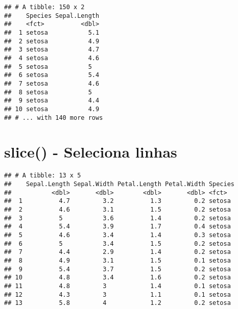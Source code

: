 \documentclass[]{book}
\newenvironment{Shaded}{\begin{snugshade}}{\end{snugshade}}
\newcommand{\DecValTok}[1]{\textcolor[rgb]{0.00,0.00,0.81}{#1}}
\newcommand{\KeywordTok}[1]{\textcolor[rgb]{0.13,0.29,0.53}{\textbf{#1}}}
\newcommand{\NormalTok}[1]{#1}
\newcommand{\OperatorTok}[1]{\textcolor[rgb]{0.81,0.36,0.00}{\textbf{#1}}}
\newcommand{\StringTok}[1]{\textcolor[rgb]{0.31,0.60,0.02}{#1}}
\begin{document}
\begin{Shaded}
\end{Shaded}

\begin{verbatim}
## # A tibble: 150 x 2
##    Species Sepal.Length
##    <fct>          <dbl>
##  1 setosa           5.1
##  2 setosa           4.9
##  3 setosa           4.7
##  4 setosa           4.6
##  5 setosa           5  
##  6 setosa           5.4
##  7 setosa           4.6
##  8 setosa           5  
##  9 setosa           4.4
## 10 setosa           4.9
## # ... with 140 more rows
\end{verbatim}

\hypertarget{slice---seleciona-linhas}{%
\section{slice() - Seleciona linhas}\label{slice---seleciona-linhas}}

\begin{Shaded}
\end{Shaded}

\begin{verbatim}
## # A tibble: 13 x 5
##    Sepal.Length Sepal.Width Petal.Length Petal.Width Species
##           <dbl>       <dbl>        <dbl>       <dbl> <fct>  
##  1          4.7         3.2          1.3         0.2 setosa 
##  2          4.6         3.1          1.5         0.2 setosa 
##  3          5           3.6          1.4         0.2 setosa 
##  4          5.4         3.9          1.7         0.4 setosa 
##  5          4.6         3.4          1.4         0.3 setosa 
##  6          5           3.4          1.5         0.2 setosa 
##  7          4.4         2.9          1.4         0.2 setosa 
##  8          4.9         3.1          1.5         0.1 setosa 
##  9          5.4         3.7          1.5         0.2 setosa 
## 10          4.8         3.4          1.6         0.2 setosa 
## 11          4.8         3            1.4         0.1 setosa 
## 12          4.3         3            1.1         0.1 setosa 
## 13          5.8         4            1.2         0.2 setosa
\end{verbatim}
\end{document}
